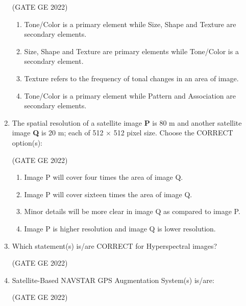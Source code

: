 \documentclass[journal,12pt,onecolumn]{IEEEtran}
\theoremstyle{remark}
\begin{document}
\begin{enumerate}
\hfill (GATE GE 2022)

\begin{enumerate}
    \item Tone/Color is a primary element while Size, Shape and Texture are secondary elements.
    \item Size, Shape and Texture are primary elements while Tone/Color is a secondary element.
    \item Texture refers to the frequency of tonal changes in an area of image.
    \item Tone/Color is a primary element while Pattern and Association are secondary elements.
\end{enumerate}

\item The spatial resolution of a satellite image \textbf{P} is 80 m and another satellite image \textbf{Q} is 20 m; each of 512 $\times$ 512 pixel size. Choose the CORRECT option(s):

\hfill (GATE GE 2022)

\begin{enumerate}
    \item Image P will cover four times the area of image Q.
    \item Image P will cover sixteen times the area of image Q.
    \item Minor details will be more clear in image Q as compared to image P.
    \item Image P is higher resolution and image Q is lower resolution.
\end{enumerate}

\item Which statement(s) is/are CORRECT for Hyperspectral images?

\hfill (GATE GE 2022)

\begin{enumerate}
\end{enumerate}

\item Satellite-Based NAVSTAR GPS Augmentation System(s) is/are:

\hfill (GATE GE 2022)


\end{enumerate}
\end{document}
